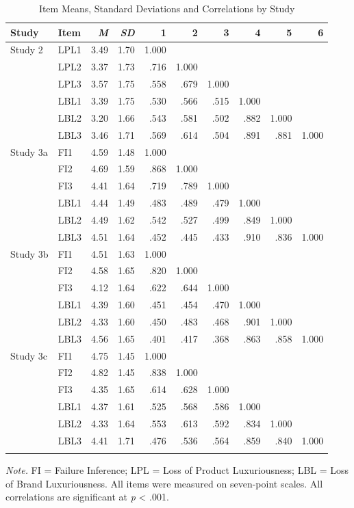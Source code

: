\documentclass[12pt, a4paper]{article}
\begin{document}
\begin{table}[H]
\centering
\begin{singlespace}
\caption{Item Means, Standard Deviations and Correlations by Study}
\begin{tabular}{@{}llrrrrrrrr@{}}
\toprule
Study & Item & \emph{M} & \emph{SD} & 1 & 2 & 3 & 4 & 5 & 6 \\
\midrule
Study 2 & LPL1 & 3.49 & 1.70 & 1.000 &  &  &  &  &  \\
 & LPL2 & 3.37 & 1.73 & .716 & 1.000 &  &  &  &  \\
 & LPL3 & 3.57 & 1.75 & .558 & .679 & 1.000 &  &  &  \\
 & LBL1 & 3.39 & 1.75 & .530 & .566 & .515 & 1.000 &  &  \\
 & LBL2 & 3.20 & 1.66 & .543 & .581 & .502 & .882 & 1.000 &  \\
 & LBL3 & 3.46 & 1.71 & .569 & .614 & .504 & .891 & .881 & 1.000 \\
\addlinespace
Study 3a & FI1 & 4.59 & 1.48 & 1.000 &  &  &  &  &  \\
 & FI2 & 4.69 & 1.59 & .868 & 1.000 &  &  &  &  \\
 & FI3 & 4.41 & 1.64 & .719 & .789 & 1.000 &  &  &  \\
 & LBL1 & 4.44 & 1.49 & .483 & .489 & .479 & 1.000 &  &  \\
 & LBL2 & 4.49 & 1.62 & .542 & .527 & .499 & .849 & 1.000 &  \\
 & LBL3 & 4.51 & 1.64 & .452 & .445 & .433 & .910 & .836 & 1.000 \\
\addlinespace
Study 3b & FI1 & 4.51 & 1.63 & 1.000 &  &  &  &  &  \\
 & FI2 & 4.58 & 1.65 & .820 & 1.000 &  &  &  &  \\
 & FI3 & 4.12 & 1.64 & .622 & .644 & 1.000 &  &  &  \\
 & LBL1 & 4.39 & 1.60 & .451 & .454 & .470 & 1.000 &  &  \\
 & LBL2 & 4.33 & 1.60 & .450 & .483 & .468 & .901 & 1.000 &  \\
 & LBL3 & 4.56 & 1.65 & .401 & .417 & .368 & .863 & .858 & 1.000 \\
\addlinespace
Study 3c & FI1 & 4.75 & 1.45 & 1.000 &  &  &  &  &  \\
 & FI2 & 4.82 & 1.45 & .838 & 1.000 &  &  &  &  \\
 & FI3 & 4.35 & 1.65 & .614 & .628 & 1.000 &  &  &  \\
 & LBL1 & 4.37 & 1.61 & .525 & .568 & .586 & 1.000 &  &  \\
 & LBL2 & 4.33 & 1.64 & .553 & .613 & .592 & .834 & 1.000 &  \\
 & LBL3 & 4.41 & 1.71 & .476 & .536 & .564 & .859 & .840 & 1.000 \\
\addlinespace
\bottomrule
\end{tabular}
\raggedright\emph{Note.} FI = Failure Inference; LPL = Loss of Product Luxuriousness; LBL = Loss of Brand Luxuriousness. All items were measured on seven-point scales. All correlations are significant at \emph{p} \textless{} .001.
\end{singlespace}
\end{table}
\end{document}
